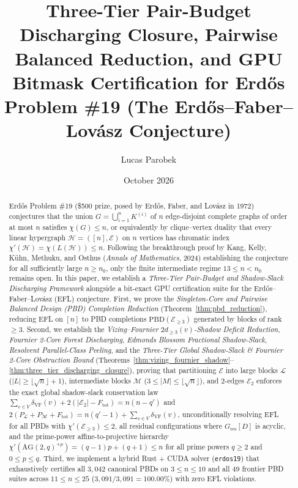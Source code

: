 \documentclass[11pt,reqno]{amsart}
\title[Three-Tier Discharging Closure and GPU Certification for Erd\H{o}s \#19]{Three-Tier Pair-Budget Discharging Closure, Pairwise Balanced Reduction, and GPU Bitmask Certification for Erd\H{o}s Problem \#19 (The Erd\H{o}s--Faber--Lov\'asz Conjecture)}
\author{Lucas Parobek}
\date{October 2026}
\theoremstyle{definition}
\theoremstyle{remark}
\begin{document}
\begin{abstract}
Erd\H{o}s Problem \#19 (\$500 prize, posed by Erd\H{o}s, Faber, and Lov\'asz in 1972) conjectures that the union $G = \bigcup_{i=1}^n K^{(i)}$ of $n$ edge-disjoint complete graphs of order at most $n$ satisfies $\chi(G) \le n$, or equivalently by clique--vertex duality that every linear hypergraph $\mathcal{H} = ([n], \mathcal{E})$ on $n$ vertices has chromatic index $\chi'(\mathcal{H}) = \chi(L(\mathcal{H})) \le n$. Following the breakthrough proof by Kang, Kelly, K\"uhn, Methuku, and Osthus (\emph{Annals of Mathematics}, 2024) establishing the conjecture for all sufficiently large $n \ge n_0$, only the finite intermediate regime $13 \le n < n_0$ remains open. In this paper, we establish a \emph{Three-Tier Pair-Budget and Shadow-Slack Discharging Framework} alongside a bit-exact GPU certification suite for the Erd\H{o}s--Faber--Lov\'asz (EFL) conjecture. First, we prove the \emph{Singleton-Core and Pairwise Balanced Design (PBD) Completion Reduction} (Theorem~\ref{thm:pbd_reduction}), reducing EFL on $[n]$ to PBD completions $\mathrm{PBD}(\mathcal{E}_{\ge 3})$ generated by blocks of rank $\ge 3$. Second, we establish the \emph{Vizing--Fournier $2 d_{\ge 3}(v)$-Shadow Deficit Reduction}, \emph{Fournier 2-Core Forest Discharging}, \emph{Edmonds Blossom Fractional Shadow-Slack}, \emph{Resolvent Parallel-Class Peeling}, and the \emph{Three-Tier Global Shadow-Slack \& Fournier 2-Core Obstruction Bound} (Theorems~\ref{thm:vizing_fournier_shadow}--\ref{thm:three_tier_discharging_closure}), proving that partitioning $\mathcal{E}$ into large blocks $\mathcal{L}$ ($|L| \ge \lfloor\sqrt{n}\rfloor + 1$), intermediate blocks $\mathcal{M}$ ($3 \le |M| \le \lfloor\sqrt{n}\rfloor$), and $2$-edges $\mathcal{E}_2$ enforces the exact global shadow-slack conservation law $\sum_{v \in V} \delta_{\mathrm{VF}}(v) + 2(|\mathcal{E}_2| - F_{\mathrm{tot}}) = n(n - q')$ and $2(P_{\mathcal{L}} + P_{\mathcal{M}} + F_{\mathrm{tot}}) = n(q' - 1) + \sum_{v \in V} \delta_{\mathrm{VF}}(v)$, unconditionally resolving EFL for all PBDs with $\chi'(\mathcal{E}_{\ge 3}) \le 2$, all residual configurations where $G_{\mathrm{res}}[D]$ is acyclic, and the prime-power affine-to-projective hierarchy $\chi'(\mathrm{AG}(2,q)^{+p}) = (q-1)p + (q+1) \le n$ for all prime powers $q \ge 2$ and $0 \le p \le q$. Third, we implement a hybrid Rust + CUDA solver (\texttt{erdos19}) that exhaustively certifies all $3{,}042$ canonical PBDs on $3 \le n \le 10$ and all $49$ frontier PBD suites across $11 \le n \le 25$ ($3{,}091 / 3{,}091 = 100.00\%$) with zero EFL violations.
\end{abstract}
\end{document}
